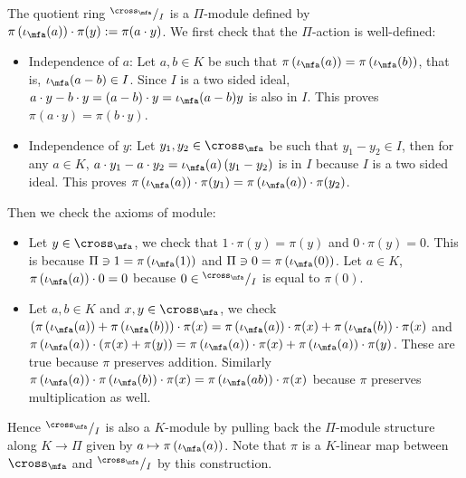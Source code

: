 \begin{construction}\label{con:cross-product-simple-ring-mod}
  The quotient ring ${}^{\cross_{\mfa}}/_{I}$ is a $\Pi$-module defined by $\pi\left(\iota_{\mfa}(a)\right)\cdot \pi(y) := \pi(a \cdot y)$. We first check that the $\Pi$-action is well-defined:
  \begin{itemize}
    \item Independence of $a$: Let $a, b \in K$ be such that $\pi\left(\iota_{\mfa}(a)\right) = \pi\left(\iota_{\mfa}(b)\right)$, that is, $\iota_{\mfa}(a-b)\in I$. Since $I$ is a two sided ideal, $a\cdot y - b \cdot y = (a - b)\cdot y = \iota_{\mfa}(a - b) y$ is also in $I$. This proves $\pi(a\cdot y) = \pi(b\cdot y)$.
    \item Independence of $y$: Let $y_{1},y_{2}\in\cross_{\mfa}$ be such that $y_{1}-y_{2}\in I$, then for any $a \in K$, $a \cdot y_{1} - a \cdot y_{2} = \iota_{\mfa}(a)\left(y_{1}-y_{2}\right)$ is in $I$ because $I$ is a two sided ideal. This proves $\pi\left(\iota_{\mfa}(a)\right)\cdot \pi(y_{1}) = \pi\left(\iota_{\mfa}(a)\right)\cdot \pi(y_{2})$.
  \end{itemize}
  Then we check the axioms of module:
  \begin{itemize}
    \item Let $y \in \cross_{\mfa}$, we check that $1 \cdot \pi(y) = \pi(y)$ and $0 \cdot \pi(y) = 0$. This is because $\Pi\ni 1 = \pi\left(\iota_{\mfa}(1)\right)$ and $\Pi\ni 0=\pi\left(\iota_{\mfa}(0)\right)$. Let $a \in K$, $\pi\left(\iota_{\mfa}(a)\right)\cdot 0 = 0$ because $0 \in {}^{\cross_{\mfa}}/_{I}$ is equal to $\pi(0)$.
    \item Let $a, b \in K$ and $x, y \in \cross_{\mfa}$, we check $\left(\pi\left(\iota_{\mfa}(a)\right) + \pi\left(\iota_{\mfa}(b)\right)\right)\cdot \pi(x) = \pi\left(\iota_{\mfa}(a)\right)\cdot\pi(x) + \pi\left(\iota_{\mfa}(b)\right)\cdot \pi(x)$ and $\pi\left(\iota_{\mfa}(a)\right)\cdot(\pi(x)+\pi(y)) = \pi\left(\iota_{\mfa}(a)\right)\cdot\pi(x) + \pi\left(\iota_{\mfa}(a)\right)\cdot\pi(y)$. These are true because $\pi$ preserves addition. Similarly $\pi\left(\iota_{\mfa}(a)\right)\cdot \pi\left(\iota_{\mfa}(b)\right) \cdot \pi(x) = \pi\left(\iota_{\mfa}(ab)\right)\cdot \pi(x)$ because $\pi$ preserves multiplication as well.
  \end{itemize}

  Hence ${}^{\cross_{\mfa}}/_{I}$ is also a $K$-module by pulling back the $\Pi$-module structure along $K \to \Pi$ given by $a \mapsto \pi\left(\iota_{\mfa}(a)\right)$. Note that $\pi$ is a $K$-linear map between $\cross_{\mfa}$ and ${}^{\cross_{\mfa}}/_{I}$ by this construction.
  \leanok
\end{construction}


